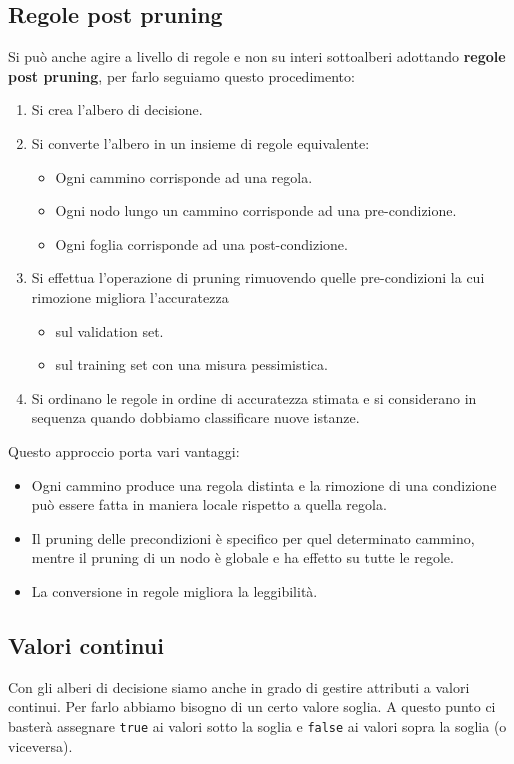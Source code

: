 \subsection{Regole post pruning}
Si pu\`o anche agire a livello di regole e non su interi sottoalberi adottando \textbf{regole post pruning}, per farlo
seguiamo questo procedimento:
\begin{enumerate}
	\item Si crea l'albero di decisione.
	\item Si converte l'albero in un insieme di regole equivalente:
	      \begin{itemize}
		      \item Ogni cammino corrisponde ad una regola.
		      \item Ogni nodo lungo un cammino corrisponde ad una pre-condizione.
		      \item Ogni foglia corrisponde ad una post-condizione.
	      \end{itemize}
	\item Si effettua l'operazione di pruning rimuovendo quelle pre-condizioni la cui rimozione migliora l'accuratezza
	      \begin{itemize}
		      \item sul validation set.
		      \item sul training set con una misura pessimistica.
	      \end{itemize}
	\item Si ordinano le regole in ordine di accuratezza stimata e si considerano in sequenza quando dobbiamo
	      classificare nuove istanze.
\end{enumerate}
Questo approccio porta vari vantaggi:
\begin{itemize}
	\item Ogni cammino produce una regola distinta e la rimozione di una condizione pu\`o essere fatta in maniera
	      locale rispetto a quella regola.
	\item Il pruning delle precondizioni \`e specifico per quel determinato cammino, mentre il pruning di un nodo
	      \`e globale e ha effetto su tutte le regole.
	\item La conversione in regole migliora la leggibilit\`a.
\end{itemize}

\subsection{Valori continui}
Con gli alberi di decisione siamo anche in grado di gestire attributi a valori continui. Per farlo abbiamo bisogno di
un certo valore soglia. A questo punto ci baster\`a assegnare \verb|true| ai valori sotto la soglia e \verb|false| ai
valori sopra la soglia (o viceversa).

